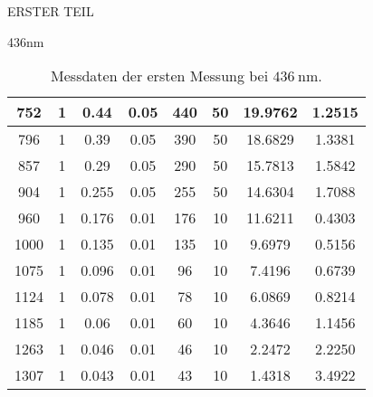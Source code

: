 \begin{appendix}
\begin{chapter}{ERSTER TEIL}
\begin{section}{436nm}
\begin{table}[htbp]
\begin{tabular}{|c|c|c|c|c|c|c|c|}
            752 & 1 & 0.44 & 0.05 & 440 & 50 & 19.9762 & 1.2515 \\ \hline
            796 & 1 & 0.39 & 0.05 & 390 & 50 & 18.6829 & 1.3381 \\ \hline
            857 & 1 & 0.29 & 0.05 & 290 & 50 & 15.7813 & 1.5842 \\ \hline
            904 & 1 & 0.255 & 0.05 & 255 & 50 & 14.6304 & 1.7088 \\ \hline
            960 & 1 & 0.176 & 0.01 & 176 & 10 & 11.6211 & 0.4303 \\ \hline
            1000 & 1 & 0.135 & 0.01 & 135 & 10 & 9.6979 & 0.5156 \\ \hline
            1075 & 1 & 0.096 & 0.01 & 96 & 10 & 7.4196 & 0.6739 \\ \hline
            1124 & 1 & 0.078 & 0.01 & 78 & 10 & 6.0869 & 0.8214 \\ \hline
            1185 & 1 & 0.06 & 0.01 & 60 & 10 & 4.3646 & 1.1456 \\ \hline
            1263 & 1 & 0.046 & 0.01 & 46 & 10 & 2.2472 & 2.2250 \\ \hline
            1307 & 1 & 0.043 & 0.01 & 43 & 10 & 1.4318 & 3.4922 \\ \hline
          \end{tabular}
          \caption{Messdaten der ersten Messung bei $\SI{436}{\nano\meter}$.}
          \label{tab:436_1}
        \end{table}
        

\end{section}
\end{chapter}
\end{appendix}
